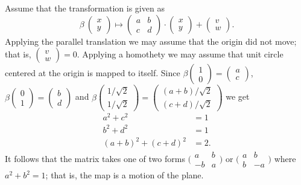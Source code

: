 Assume that the transformation is given as
\[\beta\:\left(\begin{smallmatrix}
x\\ y
\end{smallmatrix} \right)
  \mapsto
  \left(\begin{smallmatrix}
a&b\\ c&d
\end{smallmatrix} \right)
  \cdot
  \left(\begin{smallmatrix}
x\\ y
\end{smallmatrix} \right)
  +
\left(\begin{smallmatrix}
v\\ w
\end{smallmatrix} \right).
\]
Applying the parallel translation we may assume that the origin did not move; 
that is, $\left(\begin{smallmatrix}
v\\ w
\end{smallmatrix} \right)=0$.
Applying a homothety we may assume that unit circle centered at the origin is mapped to itself.
Since $\beta\left(\begin{smallmatrix}
1\\ 0
\end{smallmatrix} \right)
=
\left(\begin{smallmatrix}
a\\c 
\end{smallmatrix} \right)$,
$\beta\left(\begin{smallmatrix}
0\\ 1
\end{smallmatrix} \right)
=
\left(\begin{smallmatrix}
b\\d 
\end{smallmatrix} \right)$ 
and 
$\beta\left(\begin{smallmatrix}
1/\sqrt{2}\\ 1/\sqrt{2}
\end{smallmatrix} \right)
=
\left(\begin{smallmatrix}
(a+b)/\sqrt{2}\\(c+d)/\sqrt{2} 
\end{smallmatrix} \right)$
we get
\begin{align*}
a^2+c^2&=1\\
b^2+d^2&=1\\
(a+b)^2+(c+d)^2&=2.
\end{align*}
It follows that the matrix takes one of two forms $\bigl(\begin{smallmatrix}
a&b\\ -b&a
\end{smallmatrix} \bigr)$
or 
$\bigl(\begin{smallmatrix}
a&b\\ b&-a
\end{smallmatrix} \bigr)$ where $a^2+b^2=1$;
that is, the map is a motion of the plane.




